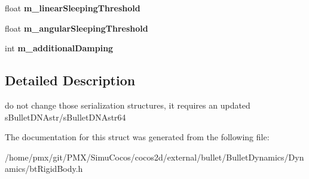 \begin{DoxyCompactItemize}
\item 
\mbox{\label{structbtRigidBodyFloatData_aecdcb04a46d8462c05375e353c0f71ea}} 
float {\bfseries m\+\_\+linear\+Sleeping\+Threshold}
\item 
\mbox{\label{structbtRigidBodyFloatData_aaf43c3a1dbe610032ddc21b9a968800c}} 
float {\bfseries m\+\_\+angular\+Sleeping\+Threshold}
\item 
\mbox{\label{structbtRigidBodyFloatData_afafbf4150a2f6ee7832b523f65aa0de2}} 
int {\bfseries m\+\_\+additional\+Damping}
\end{DoxyCompactItemize}


\subsection{Detailed Description}
do not change those serialization structures, it requires an updated s\+Bullet\+D\+N\+Astr/s\+Bullet\+D\+N\+Astr64 

The documentation for this struct was generated from the following file\+:\begin{DoxyCompactItemize}
\item 
/home/pmx/git/\+P\+M\+X/\+Simu\+Cocos/cocos2d/external/bullet/\+Bullet\+Dynamics/\+Dynamics/bt\+Rigid\+Body.\+h\end{DoxyCompactItemize}
